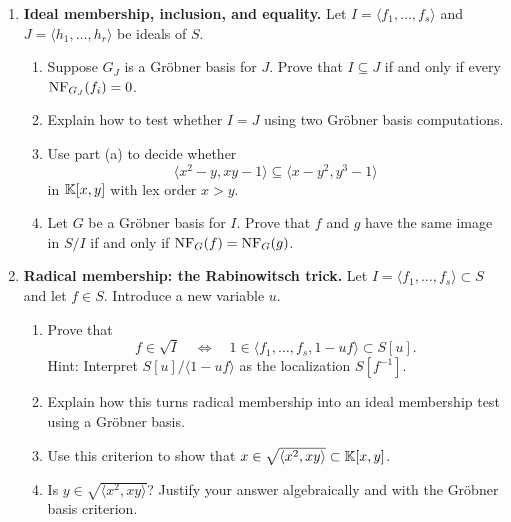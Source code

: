 \documentclass[12pt,reqno]{amsart}
\begin{document}
\begin{enumerate}[leftmargin=*, resume=problems]
\begin{enumerate}[label=(\alph*),ref=\theenumi\alph*]
    \item Use the Noetherian property of $S$ (or Dickson's Lemma for monomial ideals) to prove that the algorithm terminates.
    
    \item Prove that the output is a Gr\"obner basis for $\langle F\rangle$.
\end{enumerate}


\item \textbf{Ideal membership, inclusion, and equality.} Let $I=\langle f_1,\ldots,f_s\rangle$ and $J=\langle h_1,\ldots,h_r\rangle$ be ideals of $S$.
\begin{enumerate}[label=(\alph*),ref=\theenumi\alph*]
    \item Suppose $G_J$ is a Gr\"obner basis for $J$. Prove that $I\subseteq J$ if and only if every $\operatorname{NF}_{G_J}(f_i)=0$.
    
    \item Explain how to test whether $I=J$ using two Gr\"obner basis computations.
    
    \item Use part (a) to decide whether
    \[
    \langle x^2-y,xy-1\rangle \subseteq \langle x-y^2,y^3-1\rangle
    \]
    in $\mathbb{K}[x,y]$ with lex order $x>y$.
    
    \item Let $G$ be a Gr\"obner basis for $I$. Prove that $f$ and $g$ have the same image in $S/I$ if and only if $\operatorname{NF}_G(f)=\operatorname{NF}_G(g)$.
\end{enumerate}

\item \textbf{Radical membership: the Rabinowitsch trick.} Let $I=\langle f_1,\ldots,f_s\rangle\subset S$ and let $f\in S$. Introduce a new variable $u$.
\begin{enumerate}[label=(\alph*),ref=\theenumi\alph*]
    \item Prove that
    \[
    f\in \sqrt{I}
    \quad\Longleftrightarrow\quad
    1\in \langle f_1,\ldots,f_s,1-uf\rangle\subset S[u].
    \]
    Hint: Interpret $S[u]/\langle 1-uf\rangle$ as the localization $S[f^{-1}]$.
    
    \item Explain how this turns radical membership into an ideal membership test using a Gr\"obner basis.
    
    \item Use this criterion to show that $x\in \sqrt{\langle x^2,xy\rangle}\subset \mathbb{K}[x,y]$.
    
    \item Is $y\in \sqrt{\langle x^2,xy\rangle}$? Justify your answer algebraically and with the Gr\"obner basis criterion.
\end{enumerate}


\end{enumerate}
\end{document}
